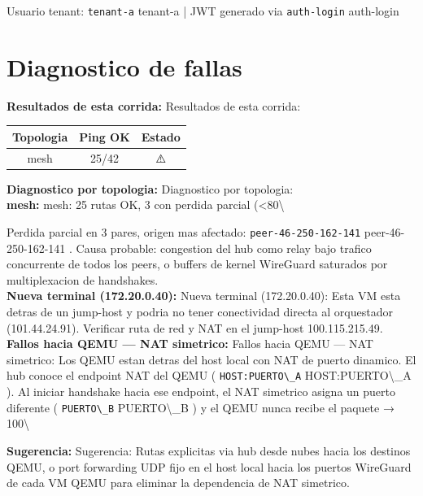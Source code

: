 \documentclass[11pt,a4paper]{article}
\begin{document}
Usuario tenant:  \texttt{tenant-a} tenant-a  | JWT generado via  \texttt{auth-login} auth-login\\

\section{Diagnostico de fallas}
\textbf{Resultados de esta corrida:} Resultados de esta corrida:\\

\begin{longtable}{|c|c|c|}
\hline
Topologia & Ping OK & Estado \\ \hline
mesh & 25/42 & ⚠️ \\ \hline
\end{longtable}

\textbf{Diagnostico por topologia:} Diagnostico por topologia:\\

\textbf{mesh:} mesh:  25 rutas OK, 3 con perdida parcial (<80\textbackslash{}%

Perdida parcial en 3 pares, origen mas afectado:  \texttt{peer-46-250-162-141} peer-46-250-162-141 . Causa probable: congestion del hub como relay bajo trafico concurrente de todos los peers, o buffers de kernel WireGuard saturados por multiplexacion de handshakes.\\

\textbf{Nueva terminal (172.20.0.40):} Nueva terminal (172.20.0.40):  Esta VM esta detras de un jump-host y podria no tener conectividad directa al orquestador (101.44.24.91). Verificar ruta de red y NAT en el jump-host 100.115.215.49.\\

\textbf{Fallos hacia QEMU — NAT simetrico:} Fallos hacia QEMU — NAT simetrico:  Los QEMU estan detras del host local con NAT de puerto dinamico. El hub conoce el endpoint NAT del QEMU ( \texttt{HOST:PUERTO\textbackslash{}_A} HOST:PUERTO\textbackslash{}_A ). Al iniciar handshake hacia ese endpoint, el NAT simetrico asigna un puerto diferente ( \texttt{PUERTO\textbackslash{}_B} PUERTO\textbackslash{}_B ) y el QEMU nunca recibe el paquete → 100\textbackslash{}%

\textbf{Sugerencia:} Sugerencia:  Rutas explicitas via hub desde nubes hacia los destinos QEMU, o port forwarding UDP fijo en el host local hacia los puertos WireGuard de cada VM QEMU para eliminar la dependencia de NAT simetrico.\\
\end{document}

